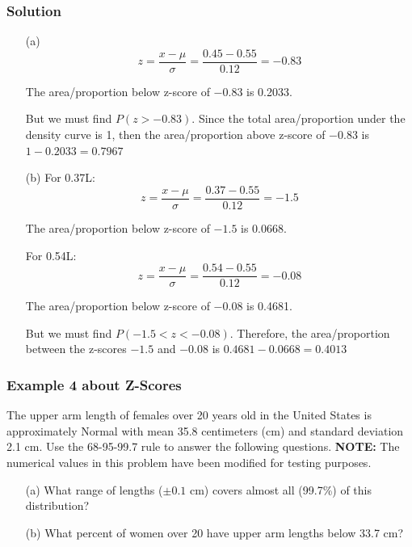 \subsubsection*{Solution}
\begin{enumerate}
    \item[(a)] 
\[
z = \frac{x - \mu}{\sigma} = \frac{0.45 - 0.55}{0.12} = -0.83
\]

The area/proportion below z-score of $-0.83$ is 0.2033.

But we must find $P(z > -0.83)$. Since the total area/proportion under the density curve is 1, then the area/proportion above z-score of $-0.83$ is \(1 - 0.2033 = \mathbf{0.7967}\)

    \item[(b)] For 0.37L:
\[
z = \frac{x - \mu}{\sigma} = \frac{0.37 - 0.55}{0.12} = -1.5
\]

The area/proportion below z-score of $-1.5$ is 0.0668.

For 0.54L:
\[
z = \frac{x - \mu}{\sigma} = \frac{0.54 - 0.55}{0.12} = -0.08
\]

The area/proportion below z-score of $-0.08$ is 0.4681.

But we must find $P(-1.5 < z < -0.08)$. Therefore, the area/proportion between the z-scores $-1.5$ and $-0.08$ is \(0.4681 - 0.0668 = \mathbf{0.4013}\)

\end{enumerate}

\subsubsection*{Example 4 about Z-Scores}
The upper arm length of females over 20 years old in the United States is approximately Normal with mean 35.8 centimeters (cm) and standard deviation 2.1 cm. Use the 68-95-99.7 rule to answer the following questions. \textbf{NOTE:} The numerical values in this problem have been modified for testing purposes.

\begin{enumerate}
    \item[(a)] What range of lengths ($\pm 0.1$ cm) covers almost all (99.7\%) of this distribution?
    \item[(b)] What percent of women over 20 have upper arm lengths below 33.7 cm?
\end{enumerate}

